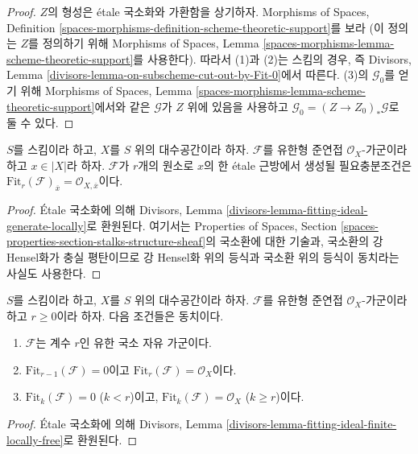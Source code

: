 \begin{proof}
$Z$의 형성은 \'etale 국소화와 가환함을 상기하자. Morphisms of Spaces,
Definition \ref{spaces-morphisms-definition-scheme-theoretic-support}를 보라
(이 정의는 $Z$를 정의하기 위해 Morphisms of Spaces, Lemma
\ref{spaces-morphisms-lemma-scheme-theoretic-support}를 사용한다). 따라서
(1)과 (2)는 스킴의 경우, 즉 Divisors, Lemma
\ref{divisors-lemma-on-subscheme-cut-out-by-Fit-0}에서 따른다. (3)의
$\mathcal{G}_0$를 얻기 위해 Morphisms of Spaces, Lemma
\ref{spaces-morphisms-lemma-scheme-theoretic-support}에서와 같은
$\mathcal{G}$가 $Z$ 위에 있음을 사용하고
$\mathcal{G}_0 = (Z \to Z_0)_*\mathcal{G}$로 둘 수 있다.
\end{proof}

\begin{lemma}
\label{lemma-fitting-ideal-generate-locally}
$S$를 스킴이라 하고, $X$를 $S$ 위의 대수공간이라 하자.
$\mathcal{F}$를 유한형 준연접 $\mathcal{O}_X$-가군이라 하고
$x \in |X|$라 하자. $\mathcal{F}$가 $r$개의 원소로 $x$의 한 \'etale
근방에서 생성될 필요충분조건은
$\text{Fit}_r(\mathcal{F})_{\overline{x}} = \mathcal{O}_{X, \overline{x}}$이다.
\end{lemma}

\begin{proof}
\'Etale 국소화에 의해 Divisors, Lemma
\ref{divisors-lemma-fitting-ideal-generate-locally}로 환원된다. 여기서는
Properties of Spaces, Section
\ref{spaces-properties-section-stalks-structure-sheaf}의 국소환에 대한 기술과,
국소환의 강 Hensel화가 충실 평탄이므로 강 Hensel화 위의 등식과 국소환
위의 등식이 동치라는 사실도 사용한다.
\end{proof}

\begin{lemma}
\label{lemma-fitting-ideal-finite-locally-free}
$S$를 스킴이라 하고, $X$를 $S$ 위의 대수공간이라 하자.
$\mathcal{F}$를 유한형 준연접 $\mathcal{O}_X$-가군이라 하고
$r \geq 0$이라 하자. 다음 조건들은 동치이다.
\begin{enumerate}
\item $\mathcal{F}$는 계수 $r$인 유한 국소 자유 가군이다.
\item $\text{Fit}_{r - 1}(\mathcal{F}) = 0$이고
$\text{Fit}_r(\mathcal{F}) = \mathcal{O}_X$이다.
\item $\text{Fit}_k(\mathcal{F}) = 0$ ($k < r$)이고,
$\text{Fit}_k(\mathcal{F}) = \mathcal{O}_X$ ($k \geq r$)이다.
\end{enumerate}
\end{lemma}

\begin{proof}
\'Etale 국소화에 의해 Divisors, Lemma
\ref{divisors-lemma-fitting-ideal-finite-locally-free}로 환원된다.
\end{proof}

